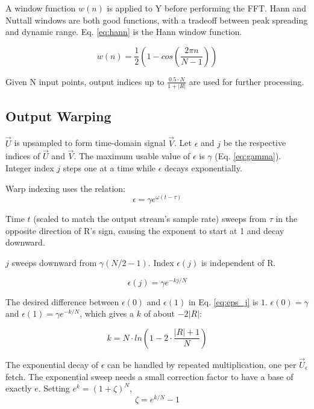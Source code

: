 A window function $w(n)$ is applied to Y before performing the FFT.
Hann and Nuttall windows are both good functions, with a tradeoff between
peak spreading and dynamic range.
Eq. \ref{eq:hann} is the Hann window function.

\begin{equation} \label{eq:hann}
w(n) = \frac{1}{2}\left(1 - cos\left( \frac{2\pi n}{N-1} \right)\right)
\end{equation}

Given N input points, output indices up to $\frac {0.5 \cdot N}{1 + |R|}$
are used for further processing.


\subsection{Output Warping}

$\vec{U}$ is upsampled to form time-domain signal $\vec{V}$.
Let $\epsilon$ and $j$ be the respective indices of $\vec{U}$ and $\vec{V}$.
The maximum usable value of $\epsilon$ is $\gamma$ (Eq. \ref{eq:gamma}).
Integer index $j$ steps one at a time while $\epsilon$ decays exponentially.

Warp indexing uses the relation:
\begin{equation}
\epsilon = \gamma e^{\omega(t - \tau)}
\end{equation}

Time $t$ (scaled to match the output stream's sample rate) sweeps from $\tau$
in the opposite direction of R's sign,
causing the exponent to start at 1 and decay downward.

$j$ sweeps downward from $\gamma(N/2-1)$.
Index $\epsilon(j)$ is independent of R.

\begin{equation}  \label{eq:eps_j}
\epsilon(j) = \gamma e^{-kj/N}
\end{equation}

The desired difference between $\epsilon(0)$ and $\epsilon(1)$ in
Eq. \ref{eq:eps_j} is $1$. $\epsilon(0) = \gamma$
and $\epsilon(1) = \gamma e^{-k/N}$,
which gives a $k$ of about $-2|R|$:

\begin{equation}  \label{eq:k}
k = N \cdot ln \left(1 - 2 \cdot \frac{|R| + 1}{N} \right)
\end{equation}

The exponential decay of $\epsilon$ can be handled by repeated multiplication,
one per $\vec{U}_\epsilon$ fetch.
The exponential sweep needs a small correction factor to have a base of exactly
$e$.
Setting $e^{k} = (1 + \zeta)^{N}$,
\begin{equation}
\zeta = e^{k/N} - 1
\end{equation}

